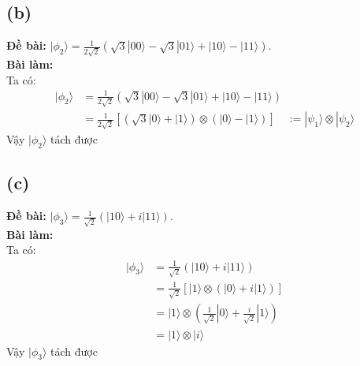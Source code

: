 \subsection{(b)}
\textbf{Đề bài:} $|\phi_{2}\rangle=\frac{1}{2\sqrt{2}}(\sqrt{3}|00\rangle-\sqrt{3}|01\rangle+|10\rangle-|11\rangle)$.\\
\textbf{Bài làm:}\\
Ta có:
\begin{align*}
    |\phi_{2}\rangle & = \frac{1}{2\sqrt{2}}\left(\sqrt{3}|00\rangle-\sqrt{3}|01\rangle+|10\rangle-|11\rangle\right) \\
                     & = \frac{1}{2\sqrt{2}}\left[(\sqrt{3}|0\rangle+|1\rangle) \otimes (|0\rangle-|1\rangle)\right] \quad
                     := |\psi_1\rangle \otimes |\psi_2\rangle
\end{align*}
Vậy $|\phi_{2}\rangle$ tách được

\subsection{(c)}
\textbf{Đề bài:} $|\phi_{3}\rangle=\frac{1}{\sqrt{2}}(|10\rangle+i|11\rangle)$.\\
\textbf{Bài làm:}\\
Ta có:
\begin{align*}
    |\phi_{3}\rangle&=\frac{1}{\sqrt{2}}\left(|10\rangle+i|11\rangle\right)\\
    &= \frac{1}{\sqrt{2}}\left[|1\rangle \otimes \left(|0\rangle + i|1\rangle\right) \right]\\
    &= |1\rangle \otimes \left(\frac{1}{\sqrt{2}}|0\rangle + \frac{i}{\sqrt{2}}|1\rangle\right)\\
    &= |1\rangle \otimes |i\rangle
\end{align*}
Vậy $|\phi_{3}\rangle$ tách được

